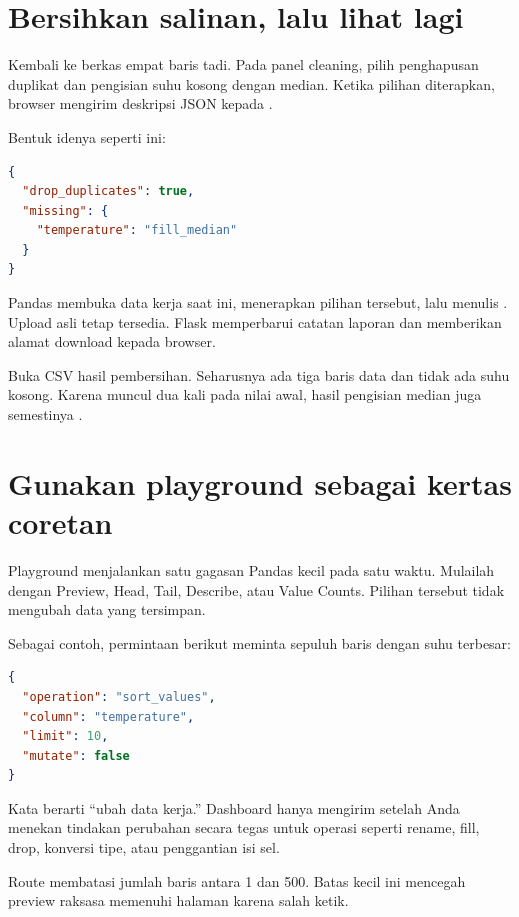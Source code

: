 \section{Bersihkan salinan, lalu lihat lagi}

Kembali ke berkas empat baris tadi. Pada panel cleaning, pilih penghapusan duplikat dan pengisian suhu kosong dengan median. Ketika pilihan diterapkan, browser mengirim deskripsi JSON kepada .

Bentuk idenya seperti ini:

\begin{lstlisting}[language=JSON,numbers=none]
{
  "drop_duplicates": true,
  "missing": {
    "temperature": "fill_median"
  }
}
\end{lstlisting}

Pandas membuka data kerja saat ini, menerapkan pilihan tersebut, lalu menulis . Upload asli tetap tersedia. Flask memperbarui catatan laporan dan memberikan alamat download kepada browser.

Buka CSV hasil pembersihan. Seharusnya ada tiga baris data dan tidak ada suhu kosong. Karena  muncul dua kali pada nilai awal, hasil pengisian median juga semestinya .

\section{Gunakan playground sebagai kertas coretan}

Playground menjalankan satu gagasan Pandas kecil pada satu waktu. Mulailah dengan Preview, Head, Tail, Describe, atau Value Counts. Pilihan tersebut tidak mengubah data yang tersimpan.

Sebagai contoh, permintaan berikut meminta sepuluh baris dengan suhu terbesar:

\begin{lstlisting}[language=JSON,numbers=none]
{
  "operation": "sort_values",
  "column": "temperature",
  "limit": 10,
  "mutate": false
}
\end{lstlisting}

Kata  berarti ``ubah data kerja.'' Dashboard hanya mengirim  setelah Anda menekan tindakan perubahan secara tegas untuk operasi seperti rename, fill, drop, konversi tipe, atau penggantian isi sel.

Route membatasi jumlah baris antara 1 dan 500. Batas kecil ini mencegah preview raksasa memenuhi halaman karena salah ketik.

